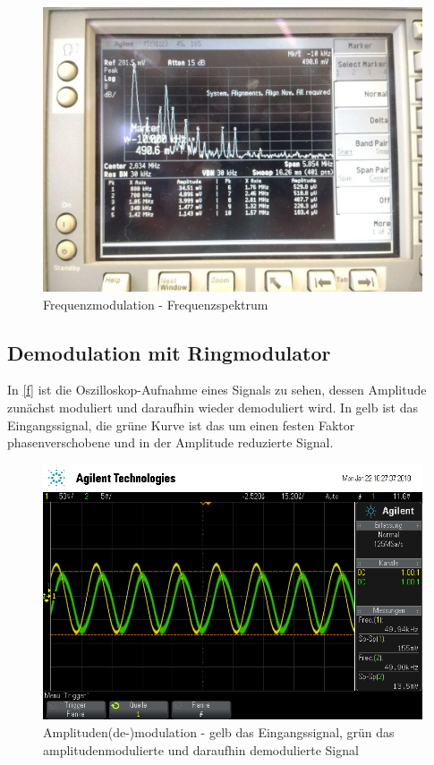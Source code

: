 \begin{figure}
	\centering
	\includegraphics[width=\textwidth]{img/Aufgabenteil_d.jpg}
	\caption{Frequenzmodulation - Frequenzspektrum}
	\label{d2}
\end{figure}

\subsection{Demodulation mit Ringmodulator}


In \autoref{f} ist die Oszilloskop-Aufnahme eines Signals zu sehen, dessen Amplitude zunächst moduliert und daraufhin wieder demoduliert wird. In gelb ist das Eingangssignal, die grüne Kurve ist das um einen festen Faktor phasenverschobene und in der Amplitude reduzierte Signal.

\begin{figure}
	\centering
	\includegraphics[width=\textwidth]{img/f_scope_235.png}
	\caption{Amplituden(de-)modulation - gelb das Eingangssignal, grün das amplitudenmodulierte und daraufhin demodulierte Signal}
	\label{f}
\end{figure}


